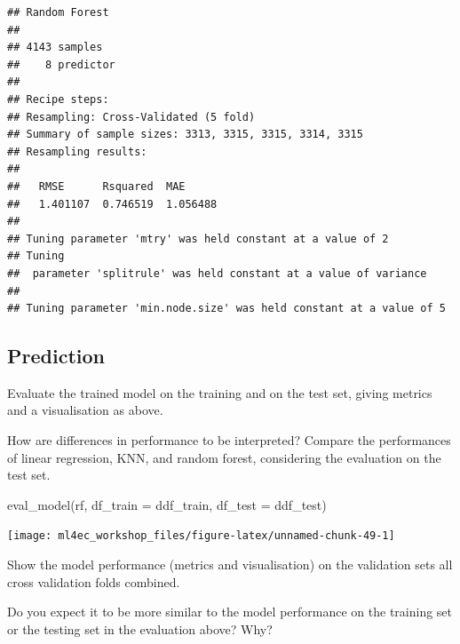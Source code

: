\documentclass[
]{book}
\newenvironment{Shaded}{\begin{snugshade}}{\end{snugshade}}
\newcommand{\AttributeTok}[1]{\textcolor[rgb]{0.77,0.63,0.00}{#1}}
\newcommand{\FunctionTok}[1]{\textcolor[rgb]{0.00,0.00,0.00}{#1}}
\newcommand{\NormalTok}[1]{#1}
\begin{document}
\begin{verbatim}
## Random Forest 
## 
## 4143 samples
##    8 predictor
## 
## Recipe steps:  
## Resampling: Cross-Validated (5 fold) 
## Summary of sample sizes: 3313, 3315, 3315, 3314, 3315 
## Resampling results:
## 
##   RMSE      Rsquared  MAE     
##   1.401107  0.746519  1.056488
## 
## Tuning parameter 'mtry' was held constant at a value of 2
## Tuning
##  parameter 'splitrule' was held constant at a value of variance
## 
## Tuning parameter 'min.node.size' was held constant at a value of 5
\end{verbatim}

\hypertarget{prediction-5}{%
\subsection{Prediction}\label{prediction-5}}

Evaluate the trained model on the training and on the test set, giving metrics and a visualisation as above.

How are differences in performance to be interpreted? Compare the performances of linear regression, KNN, and random forest, considering the evaluation on the test set.

\begin{Shaded}
\begin{Highlighting}[]
\FunctionTok{eval\_model}\NormalTok{(rf, }\AttributeTok{df\_train =}\NormalTok{ ddf\_train, }\AttributeTok{df\_test =}\NormalTok{ ddf\_test)}
\end{Highlighting}
\end{Shaded}

\begin{center}\texttt{[image: ml4ec\_workshop\_files/figure-latex/unnamed-chunk-49-1]} \end{center}

Show the model performance (metrics and visualisation) on the validation sets all cross validation folds combined.

Do you expect it to be more similar to the model performance on the training set or the testing set in the evaluation above? Why?
\end{document}
